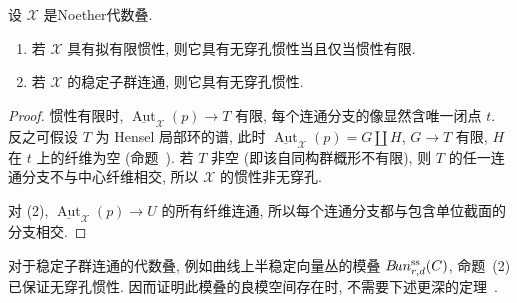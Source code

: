 \begin{proposition}\label{src:7.10.21}
设 $\mathcal X$ 是Noether代数叠.
\begin{enumerate}[(1)]
\item 若 $\mathcal X$ 具有拟有限惯性, 则它具有无穿孔惯性当且仅当惯性有限.
\item 若 $\mathcal X$ 的稳定子群连通, 则它具有无穿孔惯性.
\end{enumerate}
\end{proposition}
\begin{proof}
惯性有限时, $\underline{\operatorname{Aut}}_{\mathcal X}(p)\to T$ 有限, 每个连通分支的像显然含唯一闭点 $t$. 反之可假设 $T$ 为 Hensel 局部环的谱, 此时 $\underline{\operatorname{Aut}}_{\mathcal X}(p)=G\coprod H$, $G\to T$ 有限, $H$ 在 $t$ 上的纤维为空 (命题~). 若 $T$ 非空 (即该自同构群概形不有限), 则 $T$ 的任一连通分支不与中心纤维相交, 所以 $\mathcal X$ 的惯性非无穿孔.

对 (2), $\underline{\operatorname{Aut}}_{\mathcal X}(p)\to U$ 的所有纤维连通, 所以每个连通分支都与包含单位截面的分支相交.
\end{proof}
\begin{remark}\label{src:7.10.22}
对于稳定子群连通的代数叠, 例如曲线上半稳定向量丛的模叠 $B\!un_{r,d}^{\mathrm{ss}}(C)$, 命题~(2) 已保证无穿孔惯性. 因而证明此模叠的良模空间存在时, 不需要下述更深的定理~.
\end{remark}
